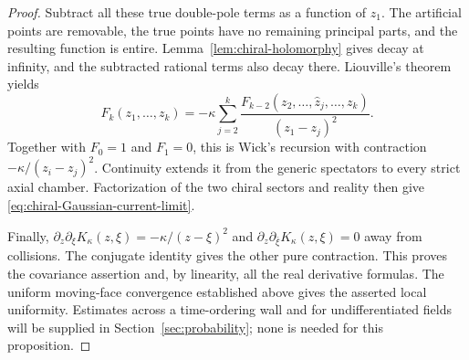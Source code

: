 \begin{proof}
Subtract all these true double-pole terms as a function of $z_1$.
The artificial points are removable, the true points have no remaining
principal parts, and the resulting function is entire.
Lemma~\ref{lem:chiral-holomorphy} gives decay at infinity, and the
subtracted rational terms also decay there. Liouville's theorem yields
\begin{equation}\label{eq:chiral-Wick-recursion}
 F_k(z_1,\ldots,z_k)
   =-\kappa\sum_{j=2}^k
       \frac{F_{k-2}(z_2,\ldots,\widehat z_j,\ldots,z_k)}
                           {(z_1-z_j)^2}.
\end{equation}
Together with $F_0=1$ and $F_1=0$, this is Wick's recursion with
contraction $-\kappa/(z_i-z_j)^2$. Continuity extends it from the
generic spectators to every strict axial chamber. Factorization of
the two chiral sectors and reality then give
\eqref{eq:chiral-Gaussian-current-limit}.

Finally,
$\partial_z\partial_\xi K_\kappa(z,\xi)=-\kappa/(z-\xi)^2$ and
$\partial_z\partial_{\bar\xi}K_\kappa(z,\xi)=0$ away from collisions.
The conjugate identity gives the other pure contraction. This proves
the covariance assertion and, by linearity, all the real derivative
formulas. The uniform moving-face convergence established above gives
the asserted local uniformity. Estimates across a time-ordering wall
and for undifferentiated fields will be supplied in
Section~\ref{sec:probability}; none is needed for this proposition.
\end{proof}
